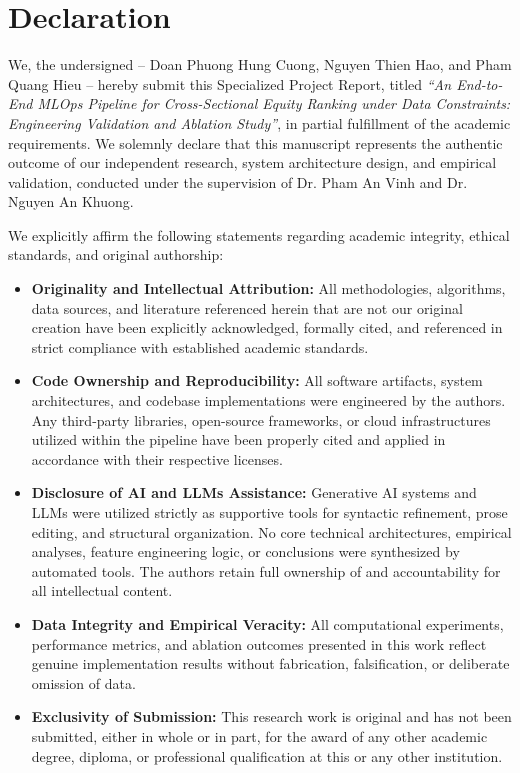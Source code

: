 \fancyfoot[C]{
	\ttfamily
	\thepage
}
\part*{Declaration} \label{part:declaration}
We, the undersigned -- Doan Phuong Hung Cuong, Nguyen Thien Hao, and Pham Quang Hieu -- hereby submit this Specialized Project Report, titled \textit{``An End-to-End \acs{MLOps} Pipeline for Cross-Sectional Equity Ranking under Data Constraints: Engineering Validation and Ablation Study''}, in partial fulfillment of the academic requirements. We solemnly declare that this manuscript represents the authentic outcome of our independent research, system architecture design, and empirical validation, conducted under the supervision of {\color{red}Dr. Pham An Vinh} and {\color{red}Dr. Nguyen An Khuong}.

We explicitly affirm the following statements regarding academic integrity, ethical standards, and original authorship:
\begin{itemize}[topsep=0pt, itemsep=0pt, parsep=0pt]
	\item \textbf{Originality and Intellectual Attribution:} All methodologies, algorithms, data sources, and literature referenced herein that are not our original creation have been explicitly acknowledged, formally cited, and referenced in strict compliance with established academic standards.
	\item \textbf{Code Ownership and Reproducibility:} All software artifacts, system architectures, and codebase implementations were engineered by the authors. Any third-party libraries, open-source frameworks, or cloud infrastructures utilized within the pipeline have been properly cited and applied in accordance with their respective licenses.
	\item \textbf{Disclosure of \acs{AI} and \acs{LLMs} Assistance:} Generative \ac{AI} systems and \ac{LLMs} were utilized strictly as supportive tools for syntactic refinement, prose editing, and structural organization. No core technical architectures, empirical analyses, feature engineering logic, or conclusions were synthesized by automated tools. The authors retain full ownership of and accountability for all intellectual content.
	\item \textbf{Data Integrity and Empirical Veracity:} All computational experiments, performance metrics, and ablation outcomes presented in this work reflect genuine implementation results without fabrication, falsification, or deliberate omission of data.
	\item \textbf{Exclusivity of Submission:} This research work is original and has not been submitted, either in whole or in part, for the award of any other academic degree, diploma, or professional qualification at this or any other institution.
\end{itemize}

